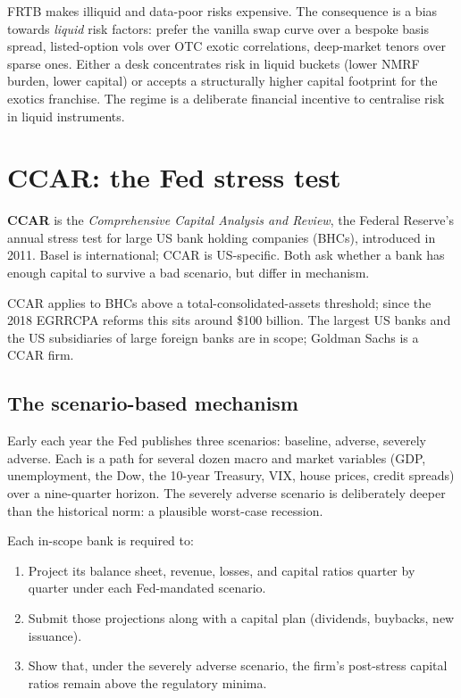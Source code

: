 \begin{intuitionbox}
FRTB makes illiquid and data-poor risks expensive.  The
consequence is a bias towards \emph{liquid} risk factors: prefer
the vanilla swap curve over a bespoke basis spread, listed-option
vols over OTC exotic correlations, deep-market tenors over sparse
ones.  Either a desk concentrates risk in liquid buckets (lower
NMRF burden, lower capital) or accepts a structurally higher
capital footprint for the exotics franchise.  The regime is a
deliberate financial incentive to centralise risk in liquid
instruments.
\end{intuitionbox}


\section{CCAR: the Fed stress test}
\label{sec:ccar}

\textbf{CCAR} is the \emph{Comprehensive Capital Analysis and
Review}, the Federal Reserve's annual stress test for large US
bank holding companies (BHCs), introduced in 2011.  Basel is
international; CCAR is US-specific.  Both ask whether a bank has
enough capital to survive a bad scenario, but differ in mechanism.

CCAR applies to BHCs above a total-consolidated-assets threshold;
since the 2018 EGRRCPA reforms this sits around \$100 billion.
The largest US banks and the US subsidiaries of large foreign
banks are in scope; Goldman Sachs is a CCAR firm.

\subsection{The scenario-based mechanism}

Early each year the Fed publishes three scenarios: baseline,
adverse, severely adverse.  Each is a path for several dozen
macro and market variables (GDP, unemployment, the Dow, the
10-year Treasury, VIX, house prices, credit spreads) over a
nine-quarter horizon.  The severely adverse scenario is
deliberately deeper than the historical norm: a plausible
worst-case recession.

Each in-scope bank is required to:
\begin{enumerate}
  \item Project its balance sheet, revenue, losses, and
    capital ratios quarter by quarter under each Fed-mandated
    scenario.
  \item Submit those projections along with a capital plan
    (dividends, buybacks, new issuance).
  \item Show that, under the severely adverse scenario, the
    firm's post-stress capital ratios remain above the
    regulatory minima.
\end{enumerate}

